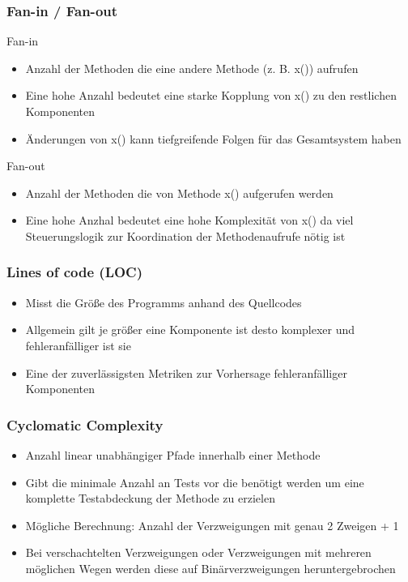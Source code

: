 \begin{frame}[fragile]
	\frametitle{Fan-in / Fan-out}
		Fan-in
		\begin{itemize}
		  \item Anzahl der Methoden die eine andere Methode (z. B. x())  aufrufen
			\item Eine hohe Anzahl bedeutet eine starke Kopplung von x() zu den restlichen Komponenten
			\item Änderungen von x() kann tiefgreifende Folgen für das Gesamtsystem haben
		\end{itemize}
		Fan-out
		\begin{itemize}
		  \item Anzahl der Methoden die von Methode x() aufgerufen werden
			\item Eine hohe Anzhal bedeutet eine hohe Komplexität von x() da
						viel Steuerungslogik zur Koordination der Methodenaufrufe nötig ist
		\end{itemize}
\end{frame}

\begin{frame}[fragile]
	\frametitle{Lines of code (LOC)}
		\begin{itemize}
		  \item Misst die Größe des Programms anhand des Quellcodes
			\item Allgemein gilt je größer eine Komponente ist desto komplexer und fehleranfälliger ist sie
			\item Eine der zuverlässigsten Metriken zur Vorhersage fehleranfälliger Komponenten
		\end{itemize}
\end{frame}

\begin{frame}[fragile]
	\frametitle{Cyclomatic Complexity}
		\begin{itemize}
		  \item Anzahl linear unabhängiger Pfade innerhalb einer Methode
			\item Gibt die minimale Anzahl an Tests vor die benötigt werden um eine
						komplette Testabdeckung der Methode zu erzielen
			\item Mögliche Berechnung: Anzahl der Verzweigungen mit genau 2 Zweigen + 1
			\item Bei verschachtelten Verzweigungen oder Verzweigungen mit mehreren möglichen Wegen
						werden diese auf Binärverzweigungen heruntergebrochen
		\end{itemize}
\end{frame}

